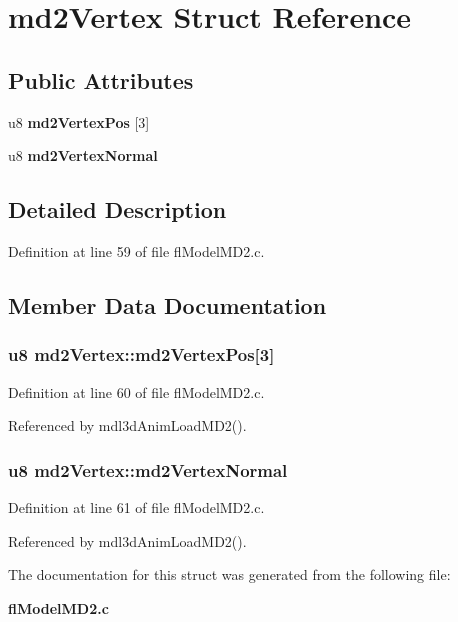 \section{md2Vertex Struct Reference}
\label{structmd2Vertex}
\subsection*{Public Attributes}
\begin{CompactItemize}
\item 
u8 {\bf md2Vertex\-Pos} [3]
\item 
u8 {\bf md2Vertex\-Normal}
\end{CompactItemize}


\subsection{Detailed Description}




Definition at line 59 of file fl\-Model\-MD2.c.

\subsection{Member Data Documentation}
\subsubsection{\setlength{\rightskip}{0pt plus 5cm}u8 {\bf md2Vertex::md2Vertex\-Pos}[3]}\label{structmd2Vertex_c8f2998d1d6d1296474ecebb1e20e6cf}




Definition at line 60 of file fl\-Model\-MD2.c.

Referenced by mdl3d\-Anim\-Load\-MD2().
\subsubsection{\setlength{\rightskip}{0pt plus 5cm}u8 {\bf md2Vertex::md2Vertex\-Normal}}\label{structmd2Vertex_794120e53aeee52ef76807ca777d5b37}




Definition at line 61 of file fl\-Model\-MD2.c.

Referenced by mdl3d\-Anim\-Load\-MD2().

The documentation for this struct was generated from the following file:\begin{CompactItemize}
\item 
{\bf fl\-Model\-MD2.c}\end{CompactItemize}
